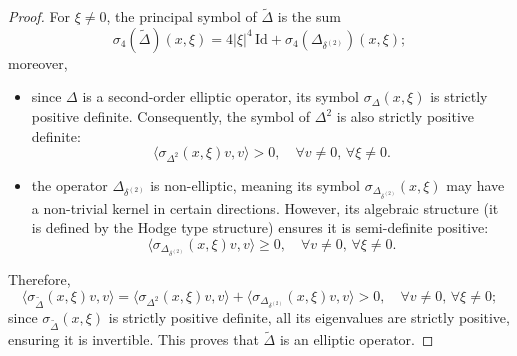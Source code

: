 \documentclass[a4paper,12pt]{article}
\begin{document}
\begin{proof}
For $\xi\neq 0$, the principal symbol of $\widetilde{\Delta}$ is the sum
\[
\sigma_4(\widetilde{\Delta})(x,\xi)
=
4|\xi|^4\,\mathrm{Id}+\sigma_4(\Delta_{\delta^{(2)}})(x,\xi);
\]
moreover,
\begin{itemize}
    \item since $\Delta$ is a second-order elliptic operator, its symbol $\sigma_{\Delta}(x, \xi)$ is strictly positive definite. Consequently, the symbol of $\Delta^2$ is also strictly positive definite:
    \begin{equation}
    \langle \sigma_{\Delta^2}(x, \xi) v, v \rangle > 0, \quad \forall v \neq 0, \, \forall \xi \neq 0.
    \end{equation}
    
    \item the operator $\Delta_{\delta^{(2)}}$ is non-elliptic, meaning its symbol $\sigma_{\Delta_{\delta^{(2)}}}(x, \xi)$ may have a non-trivial kernel in certain directions. However, its algebraic structure (it is defined by the Hodge type structure) ensures it is semi-definite positive:
    \begin{equation}
    \langle \sigma_{\Delta_{\delta^{(2)}}}(x, \xi) v, v \rangle \geq 0, \quad \forall v \neq 0, \, \forall \xi \neq 0.
    \end{equation}
\end{itemize}
Therefore,
\begin{equation}
\langle \sigma_{\widetilde{\Delta}}(x, \xi) v, v \rangle = \langle \sigma_{\Delta^2}(x, \xi) v, v \rangle + \langle \sigma_{\Delta_{\delta^{(2)}}}(x, \xi) v, v \rangle > 0, \quad \forall v \neq 0, \, \forall \xi \neq 0;
\end{equation}
since $\sigma_{\widetilde{\Delta}}(x, \xi)$ is strictly positive definite, all its eigenvalues are strictly positive, ensuring it is invertible. This proves that $\widetilde{\Delta}$ is an elliptic operator.
\end{proof}
\end{document}
